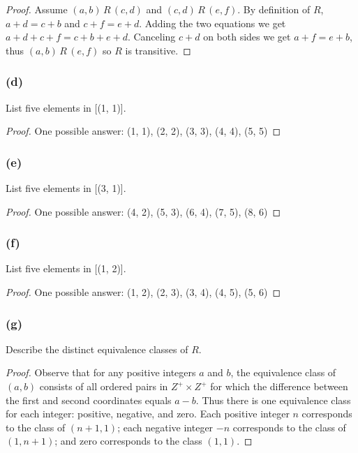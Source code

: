 \documentclass[14pt]{extarticle}
\begin{document}
\begin{proof}
        Assume \((a, b) \,R\, (c, d)\) and \((c, d)\,R\,(e, f)\). By definition of $R$, \(a + d=c + b\) and \(c + f=e + d\).
        Adding the two equations we get \(a+d+c+f = c+b+e+d\). Canceling \(c+d\) on both sides we get \(a+f = e+b\), thus
        \((a,b) \,R\, (e,f)\) so $R$ is transitive.
\end{proof}

\subsubsection{(d)}
List five elements in [(1, 1)].

\begin{proof}
        One possible answer: (1, 1), (2, 2), (3, 3), (4, 4), (5, 5)
\end{proof}

\subsubsection{(e)}
List five elements in [(3, 1)].

\begin{proof}
        One possible answer: (4, 2), (5, 3), (6, 4), (7, 5), (8, 6)
\end{proof}

\subsubsection{(f)}
List five elements in [(1, 2)].

\begin{proof}
        One possible answer: (1, 2), (2, 3), (3, 4), (4, 5), (5, 6)
\end{proof}

\subsubsection{(g)}
Describe the distinct equivalence classes of $R$.

\begin{proof}
        Observe that for any positive integers $a$ and $b$, the equivalence class of \((a, b)\) consists of all ordered
        pairs in \(Z^+ \times Z^+\) for which the difference between the first and second coordinates equals \(a - b\).
        Thus there is one equivalence class for each integer: positive, negative, and zero. Each positive integer \(n\)
        corresponds to the class of \((n + 1, 1)\); each negative integer \(-n\) corresponds to the class of \((1, n + 1)\);
        and zero corresponds to the class \((1, 1)\).
\end{proof}
\end{document}
